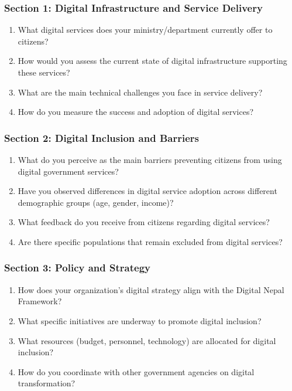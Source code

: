 \documentclass[12pt,a4paper]{article}
\begin{document}
\subsubsection{Section 1: Digital Infrastructure and Service Delivery}

\begin{enumerate}
    \item What digital services does your ministry/department currently offer to citizens?
    \item How would you assess the current state of digital infrastructure supporting these services?
    \item What are the main technical challenges you face in service delivery?
    \item How do you measure the success and adoption of digital services?
\end{enumerate}

\subsubsection{Section 2: Digital Inclusion and Barriers}

\begin{enumerate}[resume]
    \item What do you perceive as the main barriers preventing citizens from using digital government services?
    \item Have you observed differences in digital service adoption across different demographic groups (age, gender, income)?
    \item What feedback do you receive from citizens regarding digital services?
    \item Are there specific populations that remain excluded from digital services?
\end{enumerate}

\subsubsection{Section 3: Policy and Strategy}

\begin{enumerate}[resume]
    \item How does your organization's digital strategy align with the Digital Nepal Framework?
    \item What specific initiatives are underway to promote digital inclusion?
    \item What resources (budget, personnel, technology) are allocated for digital inclusion?
    \item How do you coordinate with other government agencies on digital transformation?
\end{enumerate}
\end{document}

